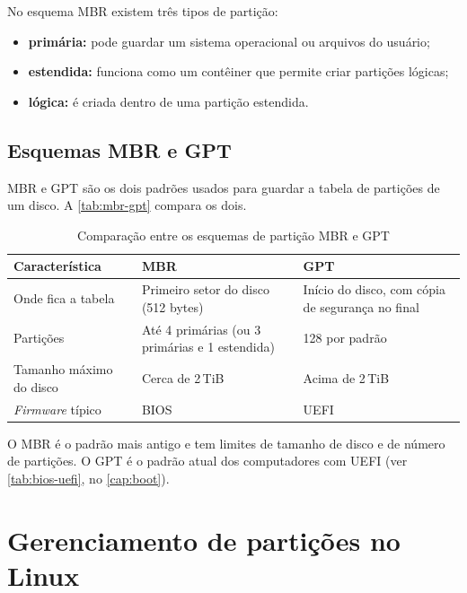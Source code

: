 No esquema MBR existem três tipos de partição:

\begin{itemize}
    \item \textbf{primária:} pode guardar um sistema operacional ou arquivos do usuário;
    \item \textbf{estendida:} funciona como um contêiner que permite criar partições lógicas;
    \item \textbf{lógica:} é criada dentro de uma partição estendida.
\end{itemize}

\subsection{Esquemas MBR e GPT}\label{subsec:mbr-gpt}

MBR e GPT são os dois padrões usados para guardar a tabela de partições de um disco. A
\autoref{tab:mbr-gpt} compara os dois.

\begin{table}[H]
    \centering
    \caption{Comparação entre os esquemas de partição MBR e GPT}
    \label{tab:mbr-gpt}
    \begin{tabularx}{\linewidth}{lXX}
        \toprule
        \textbf{Característica} & \textbf{MBR} & \textbf{GPT} \\
        \midrule
        Onde fica a tabela & Primeiro setor do disco (512 bytes) & Início do disco, com cópia de segurança no final \\
        Partições & Até 4 primárias (ou 3 primárias e 1 estendida) & 128 por padrão \\
        Tamanho máximo do disco & Cerca de 2\,TiB & Acima de 2\,TiB \\
        \textit{Firmware} típico & BIOS & UEFI \\
        \bottomrule
    \end{tabularx}
\end{table}

O MBR é o padrão mais antigo e tem limites de tamanho de disco e de número de partições. O GPT
é o padrão atual dos computadores com UEFI (ver \autoref{tab:bios-uefi}, no
\autoref{cap:boot}).

\section{Gerenciamento de partições no Linux}\label{sec:particoes-linux}


